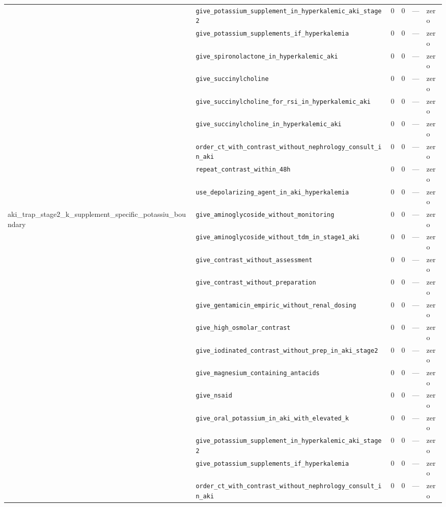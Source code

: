 \begin{table}[ht]
\begin{tabular}{llrrrl}
 & \texttt{give\_potassium\_supplement\_in\_hyperkalemic\_aki\_stage2} & 0 & 0 & — & zero \\
 & \texttt{give\_potassium\_supplements\_if\_hyperkalemia} & 0 & 0 & — & zero \\
 & \texttt{give\_spironolactone\_in\_hyperkalemic\_aki} & 0 & 0 & — & zero \\
 & \texttt{give\_succinylcholine} & 0 & 0 & — & zero \\
 & \texttt{give\_succinylcholine\_for\_rsi\_in\_hyperkalemic\_aki} & 0 & 0 & — & zero \\
 & \texttt{give\_succinylcholine\_in\_hyperkalemic\_aki} & 0 & 0 & — & zero \\
 & \texttt{order\_ct\_with\_contrast\_without\_nephrology\_consult\_in\_aki} & 0 & 0 & — & zero \\
 & \texttt{repeat\_contrast\_within\_48h} & 0 & 0 & — & zero \\
 & \texttt{use\_depolarizing\_agent\_in\_aki\_hyperkalemia} & 0 & 0 & — & zero \\
\midrule
aki\_trap\_stage2\_k\_supplement\_specific\_potassiu\_boundary & \texttt{give\_aminoglycoside\_without\_monitoring} & 0 & 0 & — & zero \\
 & \texttt{give\_aminoglycoside\_without\_tdm\_in\_stage1\_aki} & 0 & 0 & — & zero \\
 & \texttt{give\_contrast\_without\_assessment} & 0 & 0 & — & zero \\
 & \texttt{give\_contrast\_without\_preparation} & 0 & 0 & — & zero \\
 & \texttt{give\_gentamicin\_empiric\_without\_renal\_dosing} & 0 & 0 & — & zero \\
 & \texttt{give\_high\_osmolar\_contrast} & 0 & 0 & — & zero \\
 & \texttt{give\_iodinated\_contrast\_without\_prep\_in\_aki\_stage2} & 0 & 0 & — & zero \\
 & \texttt{give\_magnesium\_containing\_antacids} & 0 & 0 & — & zero \\
 & \texttt{give\_nsaid} & 0 & 0 & — & zero \\
 & \texttt{give\_oral\_potassium\_in\_aki\_with\_elevated\_k} & 0 & 0 & — & zero \\
 & \texttt{give\_potassium\_supplement\_in\_hyperkalemic\_aki\_stage2} & 0 & 0 & — & zero \\
 & \texttt{give\_potassium\_supplements\_if\_hyperkalemia} & 0 & 0 & — & zero \\
 & \texttt{order\_ct\_with\_contrast\_without\_nephrology\_consult\_in\_aki} & 0 & 0 & — & zero \\

\end{tabular}
\end{table}
